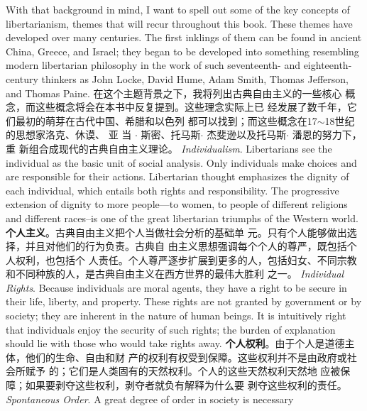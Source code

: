 \begin{paracol}{2}
With that background in mind, I want to spell out some of the
key concepts of libertarianism, themes that will recur throughout this book. These themes have developed over many centuries. The first inklings of them can be found in ancient China,
Greece, and Israel; they began to be developed into something
resembling modern libertarian philosophy in the work of such
seventeenth- and eighteenth-century thinkers as John Locke,
David Hume, Adam Smith, Thomas Jefferson, and Thomas Paine.
\switchcolumn
在这个主题背景之下，我将列出古典自由主义的一些核心
概念，而这些概念将会在本书中反复提到。这些理念实际上已
经发展了数千年，它们最初的萌芽在古代中国、希腊和以色列
都可以找到；而这些概念在17$\sim$18世纪的思想家洛克、休谟、
亚 当 $\cdot$ 斯密、托马斯$\cdot$ 杰斐逊以及托马斯$\cdot$ 潘恩的努力下，重
新组合成现代的古典自由主义理论。
\switchcolumn*
\textit{Individualism}. Libertarians see the individual as the basic unit of
social analysis. Only individuals make choices and are responsible for their actions. Libertarian thought emphasizes the dignity of each individual, which entails both rights and
responsibility. The progressive extension of dignity to more
people---to women, to people of different religions and different races--is one of the great libertarian triumphs of the Western world.
\switchcolumn
\textbf{个人主义}。古典自由主义把个人当做社会分析的基础单
元。只有个人能够做出选择，并且对他们的行为负责。古典自
由主义思想强调每个个人的尊严，既包括个人权利，也包括个
人责任。个人尊严逐步扩展到更多的人，包括妇女、不同宗教
和不同种族的人，是古典自由主义在西方世界的最伟大胜利
之一。
\switchcolumn*
\textit{Individual Rights}. Because individuals are moral agents, they
have a right to be secure in their life, liberty, and property.
These rights are not granted by government or by society; they
are inherent in the nature of human beings. It is intuitively
right that individuals enjoy the security of such rights; the burden of explanation should lie with those who would take rights away.
\switchcolumn
\textbf{个人权利}。由于个人是道德主体，他们的生命、自由和财
产的权利有权受到保障。这些权利并不是由政府或社会所赋予
的；它们是人类固有的天然权利。个人的这些天然权利天然地
应被保障；如果要剥夺这些权利，剥夺者就负有解释为什么要
剥夺这些权利的责任。
\switchcolumn*
\textit{Spontaneous Order}. A great degree of order in society is necessary

\end{paracol}
